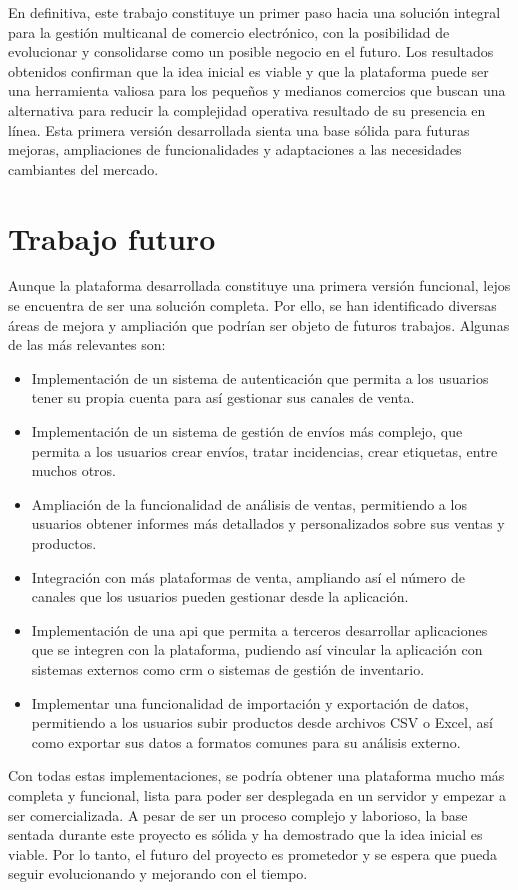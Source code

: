 En definitiva, este trabajo constituye un primer paso hacia una solución integral para la gestión multicanal de comercio electrónico, con la posibilidad de evolucionar y consolidarse como un posible negocio en el futuro. Los resultados obtenidos confirman que la idea inicial es viable y que la plataforma puede ser una herramienta valiosa para los pequeños y medianos comercios que buscan una alternativa para reducir la complejidad operativa resultado de su presencia en línea. Esta primera versión desarrollada sienta una base sólida para futuras mejoras, ampliaciones de funcionalidades y adaptaciones a las necesidades cambiantes del mercado.

\section{Trabajo futuro}

Aunque la plataforma desarrollada constituye una primera versión funcional, lejos se encuentra de ser una solución completa. Por ello, se han identificado diversas áreas de mejora y ampliación que podrían ser objeto de futuros trabajos. Algunas de las más relevantes son:

\begin{itemize}
    \item Implementación de un sistema de autenticación que permita a los usuarios tener su propia cuenta para así gestionar sus canales de venta.
    \item Implementación de un sistema de gestión de envíos más complejo, que permita a los usuarios crear envíos, tratar incidencias, crear etiquetas, entre muchos otros.
    \item Ampliación de la funcionalidad de análisis de ventas, permitiendo a los usuarios obtener informes más detallados y personalizados sobre sus ventas y productos.
    \item Integración con más plataformas de venta, ampliando así el número de canales que los usuarios pueden gestionar desde la aplicación.
    \item Implementación de una \gls{api} que permita a terceros desarrollar aplicaciones que se integren con la plataforma, pudiendo así vincular la aplicación con sistemas externos como \gls{crm} o sistemas de gestión de inventario.
    \item Implementar una funcionalidad de importación y exportación de datos, permitiendo a los usuarios subir productos desde archivos CSV o Excel, así como exportar sus datos a formatos comunes para su análisis externo.
\end{itemize}

Con todas estas implementaciones, se podría obtener una plataforma mucho más completa y funcional, lista para poder ser desplegada en un servidor y empezar a ser comercializada. A pesar de ser un proceso complejo y laborioso, la base sentada durante este proyecto es sólida y ha demostrado que la idea inicial es viable. Por lo tanto, el futuro del proyecto es prometedor y se espera que pueda seguir evolucionando y mejorando con el tiempo.